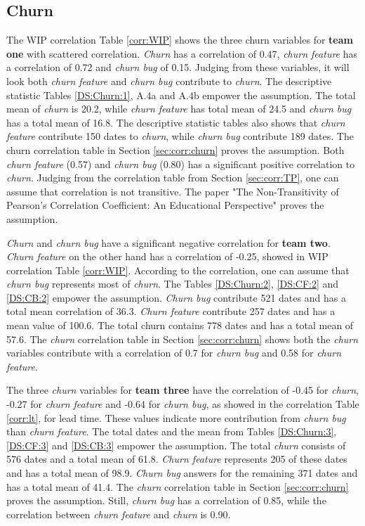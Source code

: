 \documentclass[UKenglish]{ifimaster}  %
\begin{document}
\subsection{Churn}
The WIP correlation Table \ref{corr:WIP} shows the three churn variables for \textbf{team one} with scattered correlation. \textit{Churn} has a correlation of 0.47, \textit{churn feature} has a correlation of 0.72 and \textit{churn bug} of 0.15.  Judging from these variables, it will look both \textit{churn feature} and \textit{churn bug}  contribute to \textit{churn}. The descriptive statistic Tables \ref{DS:Churn:1}, A.4a and A.4b empower the assumption. The total mean of \textit{churn} is 20.2, while \textit{churn feature} has total mean of 24.5 and \textit{churn bug} has a total mean of 16.8. The descriptive statistic tables also shows that \textit{churn feature} contribute 150 dates to \textit{churn}, while \textit{churn bug} contribute 189 dates. The churn correlation table in Section \ref{sec:corr:churn} proves the assumption. Both \textit{churn feature} (0.57) and \textit{churn bug} (0.80) has a significant positive correlation to \textit{churn}. Judging from the correlation table from Section \ref{sec:corr:TP},  one can assume that correlation is not transitive. The paper "The Non-Transitivity of Pearson's Correlation Coefficient: An Educational Perspective" \parencite{corr:transitive} proves the assumption. 

\textit{Churn} and \textit{churn bug} have a significant negative correlation for \textbf{team two}. \textit{Churn feature} on the other hand has a correlation of -0.25, showed in WIP correlation Table \ref{corr:WIP}. According to the correlation, one can assume that \textit{churn bug} represents most of \textit{churn}. The Tables \ref{DS:Churn:2}, \ref{DS:CF:2} and \ref{DS:CB:2} empower the assumption. \textit{Churn bug} contribute 521 dates and has a total mean correlation of 36.3. \textit{Churn feature} contribute 257 dates and has a mean value of 100.6. The total churn contains 778 dates and has a total mean of 57.6. The \textit{churn} correlation table in Section \ref{sec:corr:churn} shows both the \textit{churn} variables contribute with a correlation of 0.7 for \textit{churn bug} and 0.58 for \textit{churn feature}. 

The three \textit{churn} variables for \textbf{team three} have the correlation of -0.45 for \textit{churn}, -0.27 for \textit{churn feature} and -0.64 for \textit{churn bug}, as showed in the correlation Table \ref{corr:lt}, for lead time. These values indicate more contribution from \textit{churn bug}  than \textit{churn feature}. The total dates and the mean from Tables \ref{DS:Churn:3}, \ref{DS:CF:3} and \ref{DS:CB:3} empower the assumption. The total \textit{churn} consists of 576 dates and a total mean of 61.8. \textit{Churn feature}  represents 205 of these dates and has a total mean of 98.9. \textit{Churn bug} answers for the remaining 371 dates and has a total mean of 41.4. The \textit{churn} correlation table in Section \ref{sec:corr:churn} proves the assumption. Still,  \textit{churn bug} has a correlation of 0.85, while the correlation between \textit{churn feature} and \textit{churn} is 0.90.
\end{document}
